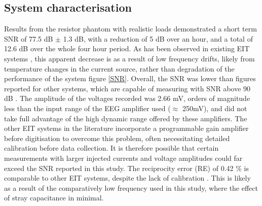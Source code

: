 \subsection{System characterisation}
Results from the resistor phantom with realistic loads demonstrated a short term SNR of 77.5 dB $\pm$ 1.3 dB, with a reduction of 5 dB over an hour, and a total of 12.6 dB over the whole four hour period. As has  been observed in existing EIT systems \cite{oh2007multi}, this apparent decrease is as a result of low frequency drifts, likely from temperature changes in the current source, rather than degradation of the performance of the system figure \ref{SNR}. Overall, the SNR was lower than figures reported for other systems, which are capable of measuring with SNR above 90 dB \cite{khan,Hun_Wi_2014}. The amplitude of the voltages recorded was 2.66 mV, orders of magnitude less than the input range of the EEG amplifier used ($\approx$ 250mV), and did not take full advantage of the high dynamic range offered by these amplifiers. The other EIT systems in the literature incorporate a programmable gain amplifier before digitisation to overcome this problem, often necessitating detailed calibration before data collection. It is therefore possible that certain measurements with larger injected currents and voltage amplitudes could far exceed the SNR reported in this study. The reciprocity error (RE) of 0.42 \% is comparable to other EIT systems, despite the lack of calibration \cite{oh2007multi,Hun_Wi_2014,khan}. This is likely as a result of the comparatively low frequency used in this study, where the effect of stray capacitance in minimal.  




